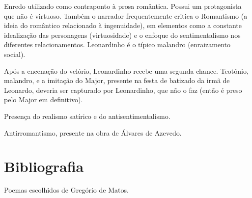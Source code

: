 \documentclass[12pt]{book}
\begin{document}
				\par Enredo utilizado como contraponto à prosa romântica. Possui um protagonista que não é virtuoso. Também o narrador frequentemente critica o Romantismo (a ideia do romântico relacionado à ingenuidade), em elementos como a constante idealização das personagens (virtuosidade) e o enfoque do sentimentalismo nos diferentes relacionamentos. Leonardinho é o típico malandro (enraizamento social).
				\par Após a encenação do velório, Leonardinho recebe uma segunda chance. Teotônio, malandro, e a imitação do Major, presente na festa de batizado da irmã de Leonardo, deveria ser capturado por Leonardinho, que não o faz (então é preso pelo Major em definitivo).
				\par Presença do realismo satírico e do antisentimentalismo.
				\par Antirromantismo, presente na obra de Álvares de Azevedo.
			
	\backmatter
	\chapter{Bibliografia}
	Poemas escolhidos de Gregório de Matos.
	
\end{document}
